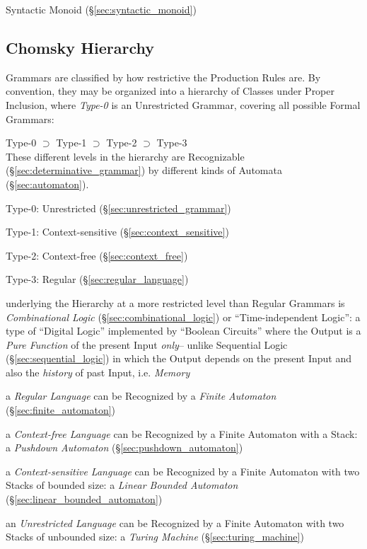 Syntactic Monoid (\S\ref{sec:syntactic_monoid})



\subsection{Chomsky Hierarchy}\label{sec:chomsky_hierarchy}
\cite{chomsky56}

Grammars are classified by how restrictive the Production Rules are. By
convention, they may be organized into a hierarchy of Classes under Proper
Inclusion, where \emph{Type-0} is an Unrestricted Grammar, covering all possible
Formal Grammars:

  Type-0 $\supset$ Type-1 $\supset$ Type-2 $\supset$ Type-3 \\
These different levels in the hierarchy are Recognizable
(\S\ref{sec:determinative_grammar}) by different kinds of Automata
(\S\ref{sec:automaton}).

Type-0: Unrestricted (\S\ref{sec:unrestricted_grammar})

Type-1: Context-sensitive (\S\ref{sec:context_sensitive})

Type-2: Context-free (\S\ref{sec:context_free})

Type-3: Regular (\S\ref{sec:regular_language})

underlying the Hierarchy at a more restricted level than Regular Grammars is
\emph{Combinational Logic} (\S\ref{sec:combinational_logic}) or
``Time-independent Logic'': a type of ``Digital Logic'' implemented by ``Boolean
Circuits'' where the Output is a \emph{Pure Function} of the present Input
\emph{only}-- unlike Sequential Logic (\S\ref{sec:sequential_logic}) in which
the Output depends on the present Input and also the \emph{history} of past
Input, i.e. \emph{Memory}

a \emph{Regular Language} can be Recognized by a \emph{Finite Automaton}
(\S\ref{sec:finite_automaton})

a \emph{Context-free Language} can be Recognized by a Finite Automaton with a
Stack: a \emph{Pushdown Automaton} (\S\ref{sec:pushdown_automaton})

a \emph{Context-sensitive Language} can be Recognized by a Finite Automaton with
two Stacks of bounded size: a \emph{Linear Bounded Automaton}
(\S\ref{sec:linear_bounded_automaton})

an \emph{Unrestricted Language} can be Recognized by a Finite Automaton with two
Stacks of unbounded size: a \emph{Turing Machine} (\S\ref{sec:turing_machine})




